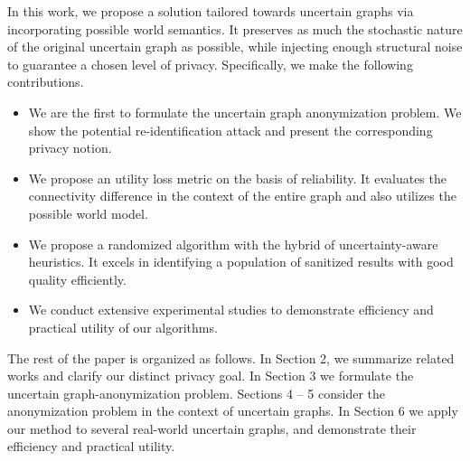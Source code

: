 In this work, we propose a solution tailored towards uncertain graphs via incorporating possible world semantics.  
It preserves as much the stochastic nature of the original uncertain graph as possible, while injecting enough structural noise to guarantee a chosen level of privacy.
Specifically, we make the following contributions.
\vspace{-5pt}
\begin{itemize}
\item We are the first to formulate the uncertain graph anonymization problem. 
 We show the potential re-identification attack and present the corresponding privacy notion. 
\item We propose an utility loss metric on the basis of reliability. It evaluates the connectivity difference in the context of the entire graph and also utilizes the possible world model. 
\item We propose a randomized algorithm with the hybrid of uncertainty-aware heuristics. It excels in identifying a population of sanitized results with good quality efficiently.
\item We conduct extensive experimental studies to demonstrate efficiency and practical utility of our algorithms.
\end{itemize}

The rest of the paper is organized as follows. In Section 2, we summarize related works and clarify our distinct privacy goal. In Section 3 we formulate the uncertain graph-anonymization problem. Sections 4 – 5 consider the anonymization problem in the context of uncertain graphs.  In Section 6 we apply our method to several real-world uncertain graphs, and demonstrate their efficiency and practical utility. 

